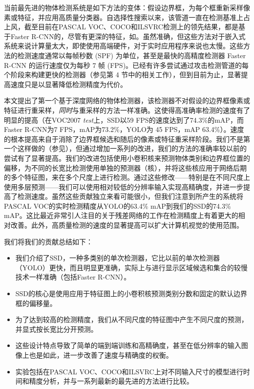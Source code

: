 \documentclass[../main.tex]{subfile}
\begin{document}
当前最先进的物体检测系统是如下方法的变体：假设边界框，为每个框重新采样像素或特征，并应用高质量分类器。自选择性搜索\cite{selective}以来，该管道一直在检测基准上占上风，截至目前在PASCAL VOC、COCO和ILSVRC检测上的领先结果，都是基于Faster R-CNN\cite{faster}的，尽管有更深的特征，如\cite{resnet}。虽然准确，但这些方法对于嵌入式系统来说计算量太大，即使使用高端硬件，对于实时应用程序来说也太慢。这些方法的检测速度通常以每帧秒数 (SPF) 为单位，甚至是最快的高精度检测器 Faster R-CNN 的运行速度仅为每秒 7 帧 (FPS)。已经有许多尝试通过攻击检测管道的每个阶段来构建更快的检测器（参见第 4 节中的相关工作），但到目前为止，显著提高速度只是以显著降低检测精度为代价。

本文提出了第一个基于深度网络的物体检测器，该检测器不对假设的边界框像素或特征进行重采样，\textit{同时}与重采样的方法一样准确。这使得高准确率检测的速度有了明显的提高（在VOC2007 \textit{test}上，SSD以59 FPS的速度达到了74.3\%的mAP，而Faster R-CNN为7 FPS，mAP为73.2\%，YOLO为 45 FPS，mAP 63.4\%）。速度的根本提高来自于消除了边界框候选和随后的像素或特征重采样阶段。我们不是第一个这样做的（参见\cite{overfeat, yolo}），但通过增加一系列的改进，我们的方法的准确率较以前的尝试有了显著提高。我们的改进包括使用小卷积核来预测物体类别和边界框位置的偏移，为不同的长宽比检测使用单独的预测器（核），并将这些核应用于网络后期的多个特征图，来在多个尺度上进行检测。通过这些修改——特别是在不同尺度上使用多层预测——我们可以使用相对较低的分辨率输入实现高精确度，并进一步提高了检测速度。虽然这些贡献独立来看可能很小，但我们注意到所产生的系统将PASCAL VOC的实时检测精度从YOLO的63.4\% mAP到我们的SSD的74.3\% mAP。这比最近非常引人注目的关于残差网络\cite{resnet}的工作在检测精度上有着更大的相对改善。此外，高质量检测的速度的显著提高可以扩大计算机视觉的使用范围。

我们将我们的贡献总结如下：
\begin{itemize}
    \item 我们介绍了SSD，一种多类别的单次检测器，它比以前的单次检测器（YOLO）更快，而且明显更准确，实际上与进行显示区域候选和集合的较慢技术一样准确（包括Faster R-CNN）。
    \item SSD的核心是使用应用于特征图上的小卷积核预测类别分数和固定的默认边界框的偏移量。
    \item 为了达到较高的检测精度，我们从不同尺度的特征图中产生不同尺度的预测，并显式按长宽比分开预测。
    \item 这些设计特点导致了简单的端到端训练和高精确度，甚至在低分辨率的输入图像上也是如此，进一步改善了速度与精确度的权衡。
    \item 实验包括在PASCAL VOC、COCO和ILSVRC上对不同输入尺寸的模型进行时间和精度分析，并与一系列最新的最先进的方法进行比较。
\end{itemize}
\end{document}
